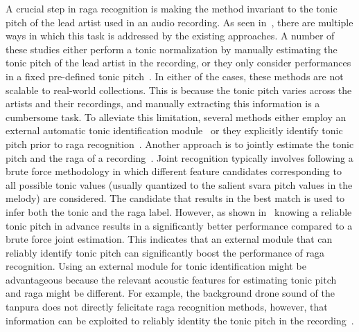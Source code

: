 A crucial step in \gls{raga} recognition is making the method invariant to the tonic pitch of the lead artist used in an audio recording. As seen in~, there are multiple ways in which this task is addressed by the existing approaches. A number of these studies either perform a tonic normalization by manually estimating the tonic pitch of the lead artist in the recording, or they only consider performances in a fixed pre-defined tonic pitch~\citep{pandey2003tansen,chordia2007raag,belle2009raga,Shetty2009}. In either of the cases, these methods are not scalable to real-world collections. This is because the tonic pitch varies across the artists and their recordings, and manually extracting this information is a cumbersome task. To alleviate this limitation, several methods either employ an external automatic tonic identification module~\citep{koduri2012raga,koduri2014intonation} or they explicitly identify tonic pitch prior to \gls{raga} recognition~\citep{ranjani2011carnatic,chakraborty2012object}. Another approach is to jointly estimate the tonic pitch and the \gls{raga} of a recording~\cite{chordia2013joint,koduri2011survey,kumar2014identifying}. Joint recognition typically involves following a brute force methodology in which different feature candidates corresponding to all possible tonic values (usually quantized to the salient \gls{svara} pitch values in the melody) are considered. The candidate that results in the best match is used to infer both the tonic and the \gls{raga} label. However, as shown in~\cite{chordia2013joint} knowing a reliable tonic pitch in advance results in a significantly better performance compared to a brute force joint estimation. This indicates that an external module that can reliably identify tonic pitch can significantly boost the performance of \gls{raga} recognition. Using an external module for tonic identification might be advantageous because the relevant acoustic features for estimating tonic pitch and \gls{raga} might be different. For example, the background drone sound of the \gls{tanpura} does not directly felicitate \gls{raga} recognition methods, however, that information can be exploited to reliably identity the tonic pitch in the recording~\citep{Gulati2014Tonic}.

